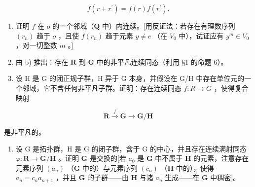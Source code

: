 \[
f (r + r ^ {\prime}) = f (r) f (r ^ {\prime}).
\]

\begin{enumerate}
\def\labelenumi{\alph{enumi})}
\setcounter{enumi}{1}
\item
  证明 \(f\) 在 \(o\) 的一个邻域（\(\mathbf{Q}\) 中）内连续。{[}用反证法：若存在有理数序列 \((r_n)\) 趋于 \(o\) ，且使 \(f(r_n)\) 趋于元素 \(y \neq e\) （在 \(V_0\) 中），试证应有 \(y^m \in V_0\) ，对一切整数 \(m\) 。{]}
\item
  由 b) 推出：存在 \(\mathbf{R}\) 到 \(\mathbf{G}\) 中的非平凡连续同态（利用 §1 的命题 6）。
\item
  设 H 是 G 的闭正规子群，H 异于 G 本身，并假设在 G/H 中存在单位元的一个邻域，它不含任何非平凡子群。证明：存在连续同态 \(f: R \rightarrow G\) ，使得复合映射
\end{enumerate}

\[
\mathbf {R} \xrightarrow {f} \mathbf {G} \to \mathbf {G} / \mathbf {H}
\]

是非平凡的。

\begin{enumerate}
\def\labelenumi{\arabic{enumi})}
\setcounter{enumi}{7}
\tightlist
\item
  设 G 是拓扑群，H 是 G 的闭子群，含于 G 的中心，并且存在连续满射同态 \(\varphi: \mathbf{R} \to \mathbf{G} / \mathbf{H}\) 。证明 \(\mathbf{G}\) 是交换的{[}若 \(a_0\) 是 \(\mathbf{G}\) 中不属于 \(\mathbf{H}\) 的元素，注意存在元素序列 \((a_n)\) （\(\mathbf{G}\) 中的）与元素序列 \((c_n)\) （\(\mathbf{H}\) 中的），使得 \(a_n = c_n a_{n+1}\) ，并且 \(\mathbf{G}\) 的子群——由 \(\mathbf{H}\) 与诸 \(a_n\) 生成——在 \(\mathbf{G}\) 中稠密{]}。
\end{enumerate}

